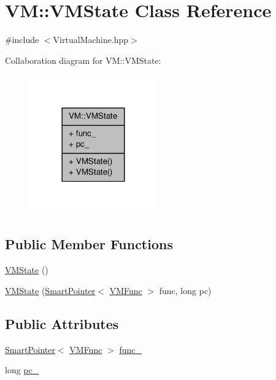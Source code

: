 \hypertarget{class_v_m_1_1_v_m_state}{\section{V\-M\-:\-:V\-M\-State Class Reference}
\label{class_v_m_1_1_v_m_state}
}


{\ttfamily \#include $<$Virtual\-Machine.\-hpp$>$}



Collaboration diagram for V\-M\-:\-:V\-M\-State\-:
\nopagebreak
\begin{figure}[H]
\begin{center}
\leavevmode
\includegraphics[width=156pt]{class_v_m_1_1_v_m_state__coll__graph}
\end{center}
\end{figure}
\subsection*{Public Member Functions}
\begin{DoxyCompactItemize}
\item 
\hyperlink{class_v_m_1_1_v_m_state_a0e304fc66ee7513a8f06714cc51fda7f}{V\-M\-State} ()
\item 
\hyperlink{class_v_m_1_1_v_m_state_a69de139721e7240b2945f741d78453ac}{V\-M\-State} (\hyperlink{_smart_pointer_8hpp_afdd8d4ba81c3fcbdeacf1dafba2accfb}{Smart\-Pointer}$<$ \hyperlink{class_v_m_1_1_v_m_func}{V\-M\-Func} $>$ func, long pc)
\end{DoxyCompactItemize}
\subsection*{Public Attributes}
\begin{DoxyCompactItemize}
\item 
\hyperlink{_smart_pointer_8hpp_afdd8d4ba81c3fcbdeacf1dafba2accfb}{Smart\-Pointer}$<$ \hyperlink{class_v_m_1_1_v_m_func}{V\-M\-Func} $>$ \hyperlink{class_v_m_1_1_v_m_state_a2ff18b30485d687b3a33815a70b76914}{func\-\_\-}
\item 
long \hyperlink{class_v_m_1_1_v_m_state_a07129fa10e4c131b28dacf7ee3aee917}{pc\-\_\-}
\end{DoxyCompactItemize}


